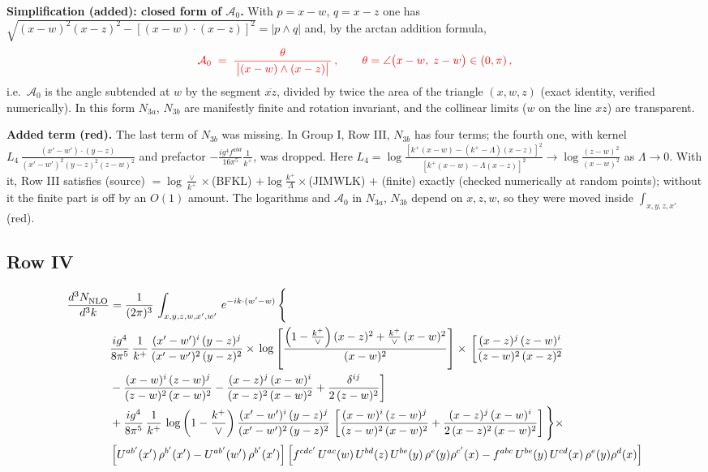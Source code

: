 \documentclass[9pt]{article}
\numberwithin{equation}{section}
\begin{document}
{\color{red}\noindent\textbf{Simplification (added): closed form of $\mathcal{A}_{0}$.} With $p=x-w$, $q=x-z$ one has $\sqrt{(x-w)^{2}(x-z)^{2}-[(x-w)\cdot(x-z)]^{2}}=|p\wedge q|$ and, by the arctan addition formula,
\begin{align}
{\color{red}\mathcal{A}_{0} \;=\; \frac{\theta}{\,\big|(x-w)\wedge(x-z)\big|\,}\,,\qquad
\theta=\angle\big(x-w,\;z-w\big)\in(0,\pi)\,,}
\end{align}
i.e.\ $\mathcal{A}_{0}$ is the angle subtended at $w$ by the segment $\overline{xz}$, divided by twice the area of the triangle $(x,w,z)$ (exact identity, verified numerically). In this form $N_{3a}$, $N_{3b}$ are manifestly finite and rotation invariant, and the collinear limits ($w$ on the line $xz$) are transparent.}\par
{\color{red}\noindent\textbf{Added term (red).} The last term of $N_{3b}$ was missing. In Group I, Row III, $N_{3b}$ has four terms; the fourth one, with kernel $L_{4}\,\frac{(x'-w')\cdot(y-z)}{(x'-w')^{2}(y-z)^{2}(z-w)^{2}}$ and prefactor $-\frac{ig^{4}f^{abd}}{16\pi^{5}}\frac{1}{k^{+}}$, was dropped. Here $L_{4}=\log\frac{[k^{+}(x-w)-(k^{+}-\Lambda)(x-z)]^{2}}{[k^{+}(x-w)-\Lambda(x-z)]^{2}}\to\log\frac{(z-w)^{2}}{(x-w)^{2}}$ as $\Lambda\to0$. With it, Row III satisfies (source) $=\log\frac{\vee}{k^{+}}\times$(BFKL) $+\log\frac{k^{+}}{\Lambda}\times$(JIMWLK) $+$ (finite) exactly (checked numerically at random points); without it the finite part is off by an $O(1)$ amount. The logarithms and $\mathcal{A}_{0}$ in $N_{3a}$, $N_{3b}$ depend on $x,z,w$, so they were moved inside $\int_{x,y,z,x'}$ (red).}\par
\subsection{Row IV}
\begin{align}
    \frac{d^{3}N_{\rm NLO}^{\rm}}{d^{3}k}  & =   \frac{1}{(2\pi)^{3}}\,
    \int_{x,y,z,w,x',w'}\,e^{-ik\cdot (w^\prime-w)}\,\Bigg\{\notag \\
& \frac{ig^{4}}{8\pi^{5}}\,\frac{1}{k^{+}}\,\frac{(x'-w')^{i}\,(y-z)^{j}}{(x'-w')^{2}\,(y-z)^{2}}\times\,\log{\left[\frac{\left(1-\frac{k^{+}}{\vee}\right)(x-z)^{2}+\frac{k^{+}}{\vee}\,(x-w)^{2}}{(x-w)^{2}}\right]}\times\, \bigg[\frac{(x-z)^{j}\,(z-w)^{i}}{(z-w)^{2}\,(x-z)^{2}}\notag \\ & -\frac{(x-w)^{i}\,(z-w)^{j}}{(z-w)^{2}\,(x-w)^{2}}-\frac{(x-z)^{j}\,(x-w)^{i}}{(x-z)^{2}\,(x-w)^{2}}+\frac{\delta^{ij}}{2\,(z-w)^{2}}\bigg] \notag \\
& + \frac{ig^{4}}{8\pi^{5}}\,\frac{1}{k^{+}}\,\log{\left(1-\frac{k^{+}}{\vee}\right)}\,\frac{(x'-w')^{i}\,(y-z)^{j}}{(x'-w')^{2}\,(y-z)^{2}}\,\left[\frac{(x-w)^{i}\,(z-w)^{j}}{(z-w)^{2}\,(x-w)^{2}}+\frac{(x-z)^{j}\,(x-w)^{i}}{2\, (x-z)^{2}\,(x-w)^{2}}\right]\Bigg\}\times\notag \\ &  \left[U^{ab'}(x')\,\rho^{b'}(x')-U^{ab'}(w')\,\rho^{b'}(x')\right] \left[f^{cdc'}\,U^{ac}(w)\,U^{bd}(z)\,U^{be}(y)\,\rho^{e}(y)\rho^{c'}(x)-f^{abc}\,U^{be}(y)\,U^{cd}(x)\,\rho^{e}(y)\rho^{d}(x)\right]
\end{align}
\end{document}
